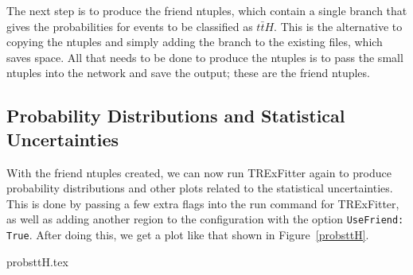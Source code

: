     The next step is to produce the friend ntuples, which contain a single branch that gives the probabilities for events to be classified as $t\bar{t}H$. This is the alternative to copying the ntuples and simply adding the branch to the existing files, which saves space. All that needs to be done to produce the ntuples is to pass the small ntuples into the network and save the output; these are the friend ntuples.



\subsection{Probability Distributions and Statistical Uncertainties}
    With the friend ntuples created, we can now run TRExFitter again to produce probability distributions and other plots related to the statistical uncertainties. This is done by passing a few extra flags into the run command for TRExFitter, as well as adding another region to the configuration with the option \texttt{UseFriend: True}. After doing this, we get a plot like that shown in Figure~\ref{probsttH}. 

    {probsttH.tex}